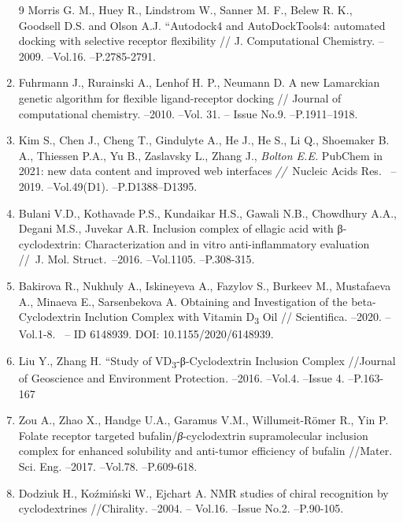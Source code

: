 \begin{enumerate}
9 Morris G. M., Huey R., Lindstrom W., Sanner M. F., Belew R. K.,
Goodsell D.S. and Olson A.J. ``Autodock4 and AutoDockTools4: automated
docking with selective receptor flexibility // J. Computational
Chemistry. --2009. --Vol.16. --P.2785-2791.

\item
Fuhrmann J., Rurainski A., Lenhof H. P., Neumann D. A new Lamarckian
genetic algorithm for flexible ligand-receptor docking // Journal of
computational chemistry. --2010. --Vol. 31. -- Issue No.9.
--P.1911--1918.

\item
Kim S., Chen J., Cheng T., Gindulyte A., He J., He S., Li Q.,
Shoemaker B. A., Thiessen P.A., Yu B., Zaslavsky L., Zhang J.,
\emph{Bolton E.E.} PubChem in 2021: new data content and improved web
interfaces \emph{//~}Nucleic Acids Res.~ --2019. --Vol.49(D1).
--P.D1388--D1395.

\item
Bulani V.D., Kothavade P.S., Kundaikar H.S., Gawali N.B., Chowdhury
A.A., Degani M.S., Juvekar A.R. Inclusion complex of ellagic acid with
β-cyclodextrin: Characterization and in vitro anti-inflammatory
evaluation //~J. Mol. Struct\emph{.}~--2016. --Vol.1105. --P.308-315.

\item
Bakirova R., Nukhuly A., Iskineyeva A., Fazylov S., Burkeev M.,
Mustafaeva A., Minaeva E., Sarsenbekova A. Obtaining and Investigation
of the beta-Cyclodextrin Inclution Complex with Vitamin
D\textsubscript{3} Oil // Scientifica. --2020. --Vol.1-8. ~-- ID
6148939. DOI: 10.1155/2020/6148939.

\item
Liu Y., Zhang H. ``Study of VD\textsubscript{3}-β-Cyclodextrin
Inclusion Complex //Journal of Geoscience and Environment
Protection\emph{.} --2016. --Vol.4. --Issue 4. --P.163-167

\item
Zou A., Zhao X., Handge U.A., Garamus V.M., Willumeit-Römer R., Yin
P. Folate receptor targeted bufalin/\emph{β}-cyclodextrin supramolecular
inclusion complex for enhanced solubility and anti-tumor efficiency of
bufalin //Mater. Sci. Eng. --2017. --Vol.78. --P.609-618.

\item
Dodziuk H., Koźmiński W., Ejchart A. NMR studies of chiral
recognition by cyclodextrines //Chirality\emph{.} --2004. -- Vol.16.
--Issue No.2. --P.90-105.
\end{enumerate}

